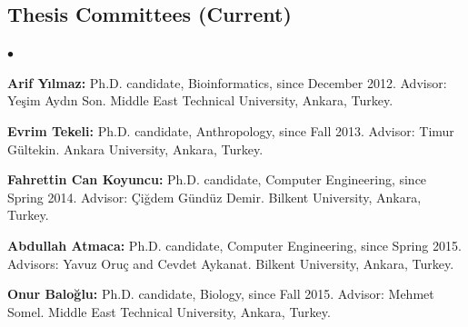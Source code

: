 \documentclass[margin,line]{res}
\newenvironment{list2}{
  \begin{list}{$\bullet$}{%
      \setlength{\itemsep}{0in}
      \setlength{\parsep}{0in} \setlength{\parskip}{0in}
      \setlength{\topsep}{0in} \setlength{\partopsep}{0in} 
      \setlength{\leftmargin}{0.2in}}}{\end{list}}
\begin{document}
\begin{resume}
\vspace*{-.6cm}
\subsection{\small \sc Thesis Committees (Current)}
\begin{list2}
\item
  {\bf Arif Yılmaz:} Ph.D. candidate, Bioinformatics, since December 2012.
  Advisor: Yeşim Aydın Son.
  Middle East Technical University, Ankara, Turkey.
\item 
  {\bf Evrim Tekeli:} Ph.D. candidate, Anthropology, since Fall 2013.
  Advisor: Timur G\"{u}ltekin.
  Ankara University, Ankara, Turkey. 
\item
  {\bf Fahrettin Can Koyuncu:} Ph.D. candidate, Computer Engineering, since Spring 2014.
  Advisor: Çiğdem Gündüz Demir.
  Bilkent University, Ankara, Turkey.
\item
  {\bf Abdullah Atmaca:} Ph.D. candidate, Computer Engineering, since Spring 2015.
  Advisors: Yavuz Oruç and Cevdet Aykanat.
  Bilkent University, Ankara, Turkey.
\item
  {\bf Onur Baloğlu:} Ph.D. candidate, Biology, since Fall 2015.
  Advisor: Mehmet Somel.
  Middle East Technical University, Ankara, Turkey.
\end{list2}


\vspace*{-.6cm}

\end{resume}
\end{document}
